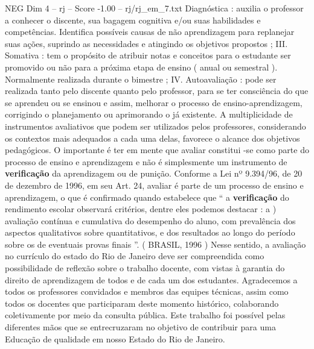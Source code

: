 \begin{textsample}{NEG Dim 4 – rj – Score -1.00 – rj/rj\_em\_7.txt}
Diagnóstica : auxilia o professor a conhecer o discente, sua bagagem cognitiva e/ou suas habilidades e competências.
Identifica possíveis causas de não aprendizagem para replanejar suas ações, suprindo as necessidades e atingindo os objetivos propostos ; III.
Somativa : tem o propósito de atribuir notas e conceitos para o estudante ser promovido ou não para a próxima etapa de ensino ( anual ou semestral ).
Normalmente realizada durante o bimestre ; IV.
Autoavaliação : pode ser realizada tanto pelo discente quanto pelo professor, para se ter consciência do que se aprendeu ou se ensinou e assim, melhorar o processo de ensino-aprendizagem, corrigindo o planejamento ou aprimorando o já existente.
A multiplicidade de instrumentos avaliativos que podem ser utilizados pelos professores, considerando os contextos mais adequados a cada uma delas, favorece o alcance dos objetivos pedagógicos.
O importante é ter em mente que avaliar constitui -se como parte do processo de ensino e aprendizagem e não é simplesmente um instrumento de \textbf{verificação} da aprendizagem ou de punição.
Conforme a Lei nº 9.394/96, de 20 de dezembro de 1996, em seu Art. 24, avaliar é parte de um processo de ensino e aprendizagem, o que é confirmado quando estabelece que “ a \textbf{verificação} do rendimento escolar observará critérios, dentre eles podemos destacar : a ) avaliação contínua e cumulativa do desempenho do aluno, com prevalência dos aspectos qualitativos sobre quantitativos, e dos resultados ao longo do período sobre os de eventuais provas finais ”. ( BRASIL, 1996 ) Nesse sentido, a avaliação no currículo do estado do Rio de Janeiro deve ser compreendida como possibilidade de reflexão sobre o trabalho docente, com vistas à garantia do direito de aprendizagem de todos e de cada um dos estudantes.
Agradecemos a todos os professores convidados e membros das equipes técnicas, assim como todos os docentes que participaram deste momento histórico, colaborando coletivamente por meio da consulta pública.
Este trabalho foi possível pelas diferentes mãos que se entrecruzaram no objetivo de contribuir para uma Educação de qualidade em nosso Estado do Rio de Janeiro.

\end{textsample}
